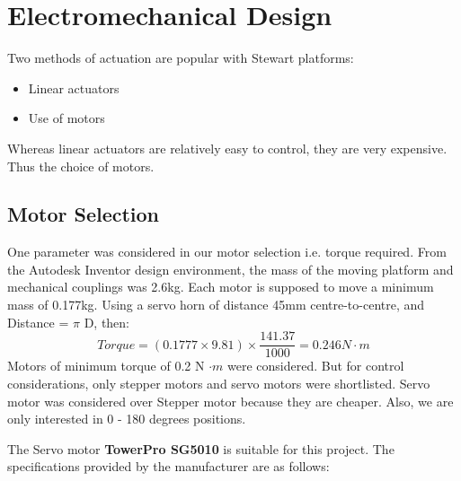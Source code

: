 \section{Electromechanical Design}
Two methods of actuation are popular with Stewart platforms:
\begin{itemize}
\item Linear actuators
\item Use of motors
\end{itemize}
Whereas linear actuators are relatively easy to control, they are very expensive. Thus the choice of motors.

\subsection{Motor Selection}
One parameter was considered in our motor selection i.e. torque required. From the Autodesk Inventor design environment, the mass of the moving platform and mechanical couplings was 2.6kg. Each motor is supposed to move a minimum mass of 0.177kg. Using a servo horn of distance 45mm centre-to-centre, and Distance = $ \pi $ D, then:
\begin{equation}
Torque = (0.1777 \times 9.81)\times \frac{141.37}{1000} = 0.246 N\cdot m
\end{equation}
Motors of minimum torque of 0.2 N $\cdot m$ were considered. But for control considerations, only stepper motors and servo motors were shortlisted. Servo motor was considered over Stepper motor because they are cheaper. Also, we are only interested in 0 - 180 degrees positions.

The Servo motor \textbf{TowerPro SG5010} is suitable for this project. The specifications provided by the manufacturer are as follows:

